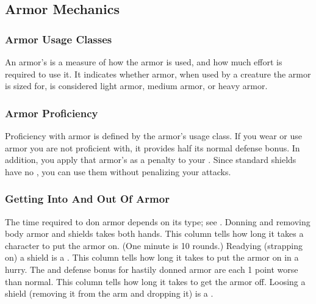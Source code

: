     \subsection{Armor Mechanics}

        \subsubsection{Armor Usage Classes}\label{Armor Usage Classes}
            An armor's  is a measure of how the armor is used, and how much effort is required to use it.
            It indicates whether armor, when used by a creature the armor is sized for, is considered light armor, medium armor, or heavy armor.

        \subsubsection{Armor Proficiency}\label{Armor Proficiency}
            Proficiency with armor is defined by the armor's usage class.
            If you wear or use armor you are not proficient with, it provides half its normal defense bonus.
            In addition, you apply that armor's  as a penalty to your .
            Since standard shields have no , you can use them without penalizing your attacks.

        \subsubsection{Getting Into And Out Of Armor}
            The time required to don armor depends on its type; see . Donning and removing body armor and shields takes both hands.
             This column tells how long it takes a character to put the armor on. (One minute is 10 rounds.) Readying (strapping on) a shield is a .
             This column tells how long it takes to put the armor on in a hurry. The  and defense bonus for hastily donned armor are each 1 point worse than normal.
             This column tells how long it takes to get the armor off. Loosing a shield (removing it from the arm and dropping it) is a .

